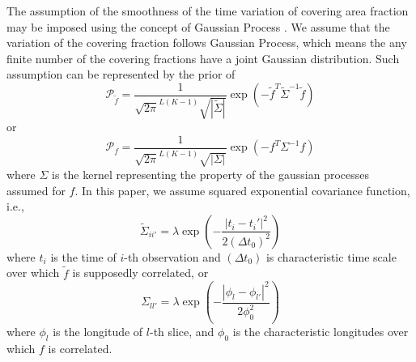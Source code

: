 \documentclass[iop,numberedappendix,apj,]{emulateapj}
\def\fast{\tilde f}
\begin{document}
The assumption of the smoothness of the time variation of covering area fraction may be imposed using the concept of Gaussian Process \citep{Rasmussen2005}. 
We assume that the variation of the covering fraction follows Gaussian Process, which means the any finite number of the covering fractions have a joint Gaussian distribution. 
Such assumption can be represented by the prior of 
\begin{equation}
\mathcal{P}_{\fast} = \frac{1}{\sqrt{ 2 \pi }^{L(K-1)} \sqrt{| \tilde \Sigma |} } \exp( - \fast^{T} \tilde \Sigma ^{-1} \fast ) 
\end{equation}
or
\begin{equation}
\mathcal{P}_f = \frac{1}{\sqrt{ 2 \pi }^{L(K-1)} \sqrt{| \Sigma  |}} \exp( - f^{T} \Sigma ^{-1} f ) 
\end{equation}
where $\Sigma $ is the kernel representing the property of the gaussian processes assumed for $f$.
In this paper, we assume squared exponential covariance function, i.e., 
\begin{equation}
\tilde \Sigma _{ii'} = \lambda \exp \left( - \frac{|t_i- t_i'|^2}{2 (\Delta t_0) ^2} \right)
\end{equation}
where $t_i$ is the time of $i$-th observation and $(\Delta t_0)$ is characteristic time scale over which $\fast $ is supposedly correlated, or 
\begin{equation}
\Sigma _{ll'} = \lambda \exp \left( - \frac{|\phi_l- \phi_{l'}|^2}{2 \phi_0^2} \right)
\end{equation}
where $\phi_l$ is the longitude of $l$-th slice, and $\phi_0$ is the characteristic longitudes over which $f$ is correlated.  
\end{document}
